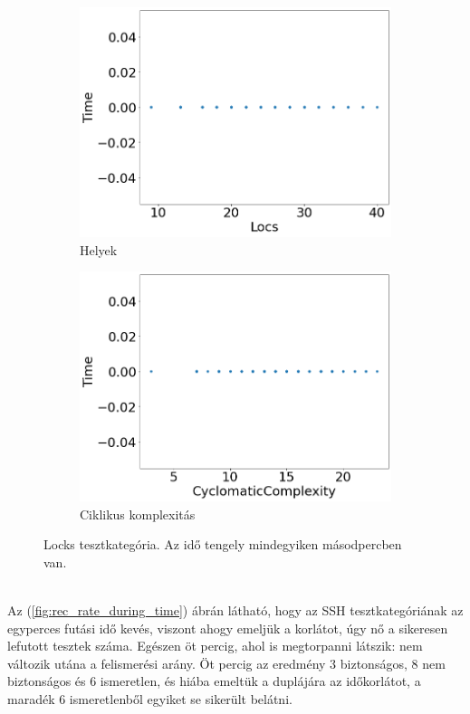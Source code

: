 \begin{figure}[ht]
\begin{subfigure}[b]{0.5\linewidth}
		\includegraphics[width=0.95\linewidth]{figures/locks/locs.png} 
		\caption{Helyek} 
		\label{fig7:c} 
	\end{subfigure}%
	\begin{subfigure}[b]{0.5\linewidth}
		\centering
		\includegraphics[width=0.95\linewidth]{figures/locks/cc.png} 
		\caption{Ciklikus komplexitás} 
		\label{fig7:d} 
	\end{subfigure} 
	\caption{Locks tesztkategória. Az idő tengely mindegyiken másodpercben van.\label{fig:locks} }
\end{figure}
\ \\
Az (\ref{fig:rec_rate_during_time}) ábrán látható, hogy az SSH tesztkategóriának az egyperces futási idő kevés, viszont ahogy emeljük a korlátot, úgy nő a sikeresen lefutott tesztek száma. Egészen öt percig, ahol is megtorpanni látszik: nem változik utána a felismerési arány. Öt percig az eredmény 3 biztonságos, 8 nem biztonságos és 6 ismeretlen, és hiába emeltük a duplájára az időkorlátot, a maradék 6 ismeretlenből egyiket se sikerült belátni. 

